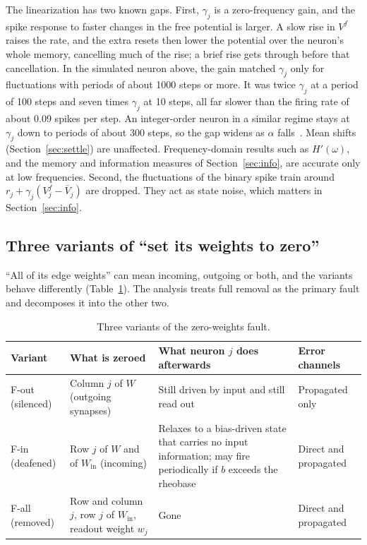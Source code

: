 \documentclass[11pt,a4paper]{article}
\begin{document}
The linearization has two known gaps. First, $\gamma_j$ is a zero-frequency gain, and the spike response to faster changes in the free potential is larger. A slow rise in $V^{f}$ raises the rate, and the extra resets then lower the potential over the neuron's whole memory, cancelling much of the rise; a brief rise gets through before that cancellation. In the simulated neuron above, the gain matched $\gamma_j$ only for fluctuations with periods of about 1000 steps or more. It was twice $\gamma_j$ at a period of 100 steps and seven times $\gamma_j$ at 10 steps, all far slower than the firing rate of about 0.09 spikes per step. An integer-order neuron in a similar regime stays at $\gamma_j$ down to periods of about 300 steps, so the gap widens as $\alpha$ falls~\cite{linsupp}. Mean shifts (Section~\ref{sec:settle}) are unaffected. Frequency-domain results such as $H'(\omega)$, and the memory and information measures of Section~\ref{sec:info}, are accurate only at low frequencies. Second, the fluctuations of the binary spike train around $r_j + \gamma_j (V^{f}_j - \bar V_j)$ are dropped. They act as state noise, which matters in Section~\ref{sec:info}.

\subsection{Three variants of ``set its weights to zero''}

``All of its edge weights'' can mean incoming, outgoing or both, and the variants behave differently (Table~\ref{tab:variants}). The analysis treats full removal as the primary fault and decomposes it into the other two.

\begin{table}[h]
\centering
\small
\begin{tabularx}{\textwidth}{@{}l>{\raggedright\arraybackslash}X>{\raggedright\arraybackslash}X>{\raggedright\arraybackslash}p{2.6cm}@{}}
\toprule
Variant & What is zeroed & What neuron $j$ does afterwards & Error channels \\
\midrule
F-out (silenced) & Column $j$ of $W$ (outgoing synapses) & Still driven by input and still read out & Propagated only \\
F-in (deafened) & Row $j$ of $W$ and of $W_{\mathrm{in}}$ (incoming) & Relaxes to a bias-driven state that carries no input information; may fire periodically if $b$ exceeds the rheobase & Direct and propagated \\
F-all (removed) & Row and column $j$, row $j$ of $W_{\mathrm{in}}$, readout weight $w_j$ & Gone & Direct and propagated \\
\bottomrule
\end{tabularx}
\caption{Three variants of the zero-weights fault.}
\label{tab:variants}
\end{table}
\end{document}
